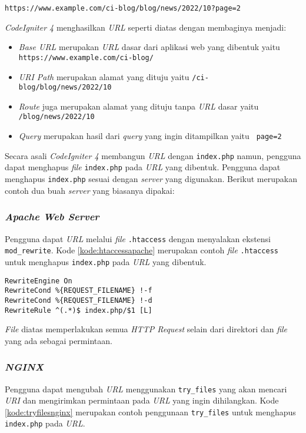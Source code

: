 \begin{center}
\texttt{https://www.example.com/ci-blog/blog/news/2022/10?page=2}
\end{center}

\textit{CodeIgniter 4} menghasilkan \textit{URL} seperti diatas dengan membaginya menjadi:

\begin{itemize}
\item \textit{Base URL} merupakan \textit{URL} dasar dari aplikasi web yang dibentuk yaitu \texttt{	
https://www.example.com/ci-blog/}
\item \textit{URI Path} merupakan alamat yang dituju yaitu \texttt{/ci-blog/blog/news/2022/10} 
\item \textit{Route} juga merupakan alamat yang dituju tanpa \textit{URL} dasar yaitu \texttt{/blog/news/2022/10} 
\item \textit{Query} merupakan hasil dari \textit{query} yang ingin ditampilkan yaitu \texttt{	
page=2}
\end{itemize}

Secara asali \textit{CodeIgniter 4} membangun \textit{URL} dengan \verb|index.php| namun, pengguna dapat menghapus \textit{file} \verb|index.php| pada \textit{URL} yang dibentuk. Pengguna dapat menghapus \verb|index.php| sesuai dengan \textit{server} yang digunakan. Berikut merupakan contoh dua buah \textit{server} yang biasanya dipakai:

\subsubsection{\textit{Apache Web Server}}
Pengguna dapat \textit{URL} melalui \textit{file} \verb|.htaccess| dengan menyalakan ekstensi \verb|mod_rewrite|. Kode \ref{kode:htaccessapache} merupakan contoh \textit{file} \verb|.htaccess| untuk menghapus \verb|index.php| pada \textit{URL} yang dibentuk.

\begin{lstlisting}[caption=Contoh \textit{file} \texttt{.htacess} pada \textit{Apache Web Server}. ,label=kode:htaccessapache]
RewriteEngine On
RewriteCond %{REQUEST_FILENAME} !-f
RewriteCond %{REQUEST_FILENAME} !-d
RewriteRule ^(.*)$ index.php/$1 [L]
\end{lstlisting}

\textit{File} diatas memperlakukan semua \textit{HTTP Request} selain dari direktori dan \textit{file} yang ada sebagai permintaan.

\subsubsection{\textit{NGINX}}
Pengguna dapat mengubah \textit{URL} menggunakan \verb|try_files| yang akan mencari \textit{URI} dan mengirimkan permintaan pada \textit{URL} yang ingin dihilangkan. Kode \ref{kode:tryfilesnginx} merupakan contoh penggunaan \verb|try_files| untuk menghapus \verb|index.php| pada \textit{URL}.

